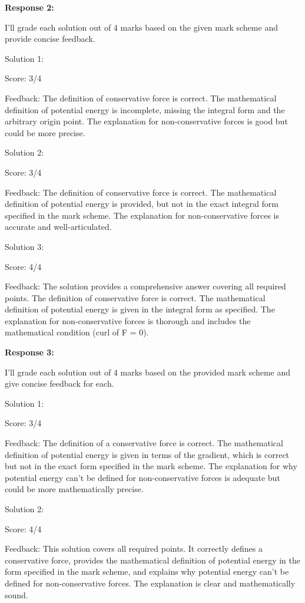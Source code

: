 \documentclass[a4paper,11pt]{article}
\begin{document}
\bigskip
\textbf{Response 2:}

I'll grade each solution out of 4 marks based on the given mark scheme and provide concise feedback.

Solution 1:

Score: 3/4

Feedback: The definition of conservative force is correct. The mathematical definition of potential energy is incomplete, missing the integral form and the arbitrary origin point. The explanation for non-conservative forces is good but could be more precise.

Solution 2:

Score: 3/4

Feedback: The definition of conservative force is correct. The mathematical definition of potential energy is provided, but not in the exact integral form specified in the mark scheme. The explanation for non-conservative forces is accurate and well-articulated.

Solution 3:

Score: 4/4

Feedback: The solution provides a comprehensive answer covering all required points. The definition of conservative force is correct. The mathematical definition of potential energy is given in the integral form as specified. The explanation for non-conservative forces is thorough and includes the mathematical condition (curl of F = 0).

\bigskip
\textbf{Response 3:}

I'll grade each solution out of 4 marks based on the provided mark scheme and give concise feedback for each.

Solution 1:

Score: 3/4

Feedback: The definition of a conservative force is correct. The mathematical definition of potential energy is given in terms of the gradient, which is correct but not in the exact form specified in the mark scheme. The explanation for why potential energy can't be defined for non-conservative forces is adequate but could be more mathematically precise.

Solution 2:

Score: 4/4

Feedback: This solution covers all required points. It correctly defines a conservative force, provides the mathematical definition of potential energy in the form specified in the mark scheme, and explains why potential energy can't be defined for non-conservative forces. The explanation is clear and mathematically sound.
\end{document}
